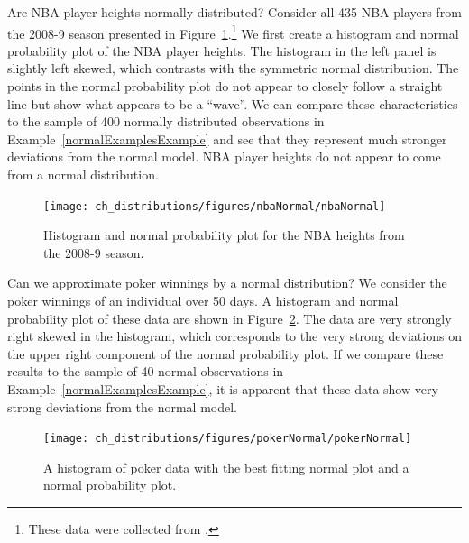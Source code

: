\begin{example}{Are NBA player heights normally distributed? Consider all 435 NBA players from the 2008-9 season presented in Figure~\ref{nbaNormal}.\footnote{These data were collected from .}}
We first create a histogram and normal probability plot of the NBA player heights. The histogram in the left panel is slightly left skewed, which contrasts with the symmetric normal distribution. The points in the normal probability plot do not appear to closely follow a straight line but show what appears to be a ``wave''. We can compare these characteristics to the sample of 400 normally distributed observations in Example~\ref{normalExamplesExample} and see that they represent much stronger deviations from the normal model. NBA player heights do not appear to come from a normal distribution.
\end{example}

\begin{figure}
\centering
\texttt{[image: ch\_distributions/figures/nbaNormal/nbaNormal]}
\caption{Histogram and normal probability plot for the NBA heights from the 2008-9 season.}
\label{nbaNormal}
\end{figure}

\begin{example}{Can we approximate poker winnings by a normal distribution? We consider the poker winnings of an individual over 50 days. A histogram and normal probability plot of these data are shown in Figure~\ref{pokerNormal}.}
The data are very strongly right skewed in the histogram, which corresponds to the very strong deviations on the upper right component of the normal probability plot. If we compare these results to the sample of 40 normal observations in Example~\ref{normalExamplesExample}, it is apparent that these data show very strong deviations from the normal model.
\end{example}

\begin{figure}
\centering
\texttt{[image: ch\_distributions/figures/pokerNormal/pokerNormal]}
\caption{A histogram of poker data with the best fitting normal plot and a normal probability plot.}
\label{pokerNormal}
\end{figure}

